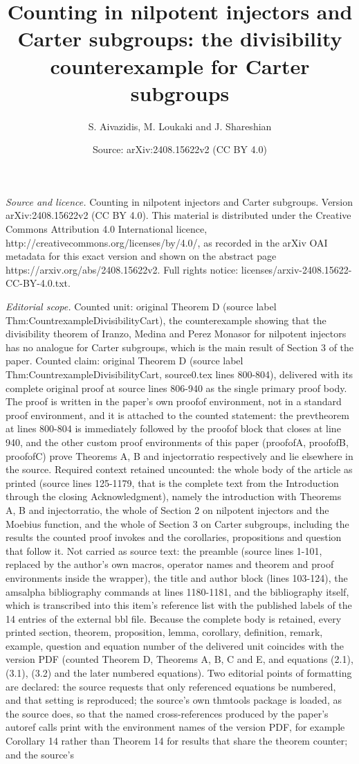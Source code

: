 \documentclass[10pt,a4paper]{amsart}
\title[Counting in nilpotent injectors and Carter subgroups: TheoremD]{Counting in nilpotent injectors and Carter subgroups: the divisibility counterexample for Carter subgroups}
\author{S. Aivazidis, M. Loukaki and J. Shareshian}
\date{Source: arXiv:2408.15622v2 (CC BY 4.0)}
\numberwithin{equation}{section}
\begin{document}
\maketitle
\noindent\emph{Source and licence.} Counting in nilpotent injectors and Carter subgroups. Version arXiv:2408.15622v2 (CC BY 4.0). This material is distributed under the Creative Commons Attribution 4.0 International licence, http://creativecommons.org/licenses/by/4.0/, as recorded in the arXiv OAI metadata for this exact version and shown on the abstract page https://arxiv.org/abs/2408.15622v2. Full rights notice: licenses/arxiv-2408.15622-CC-BY-4.0.txt.\par\smallskip
\noindent\textit{Editorial scope.} Counted unit: original Theorem D (source label Thm:CountrexampleDivisibilityCart), the counterexample showing that the divisibility theorem of Iranzo, Medina and Perez Monasor for nilpotent injectors has no analogue for Carter subgroups, which is the main result of Section 3 of the paper. Counted claim: original Theorem D (source label Thm:CountrexampleDivisibilityCart, source0.tex lines 800-804), delivered with its complete original proof at source lines 806-940 as the single primary proof body. The proof is written in the paper's own proofof environment, not in a standard proof environment, and it is attached to the counted statement: the prevtheorem at lines 800-804 is immediately followed by the proofof block that closes at line 940, and the other custom proof environments of this paper (proofofA, proofofB, proofofC) prove Theorems A, B and injectorratio respectively and lie elsewhere in the source. Required context retained uncounted: the whole body of the article as printed (source lines 125-1179, that is the complete text from the Introduction through the closing Acknowledgment), namely the introduction with Theorems A, B and injectorratio, the whole of Section 2 on nilpotent injectors and the Moebius function, and the whole of Section 3 on Carter subgroups, including the results the counted proof invokes and the corollaries, propositions and question that follow it. Not carried as source text: the preamble (source lines 1-101, replaced by the author's own macros, operator names and theorem and proof environments inside the wrapper), the title and author block (lines 103-124), the amsalpha bibliography commands at lines 1180-1181, and the bibliography itself, which is transcribed into this item's reference list with the published labels of the 14 entries of the external bbl file. Because the complete body is retained, every printed section, theorem, proposition, lemma, corollary, definition, remark, example, question and equation number of the delivered unit coincides with the version PDF (counted Theorem D, Theorems A, B, C and E, and equations (2.1), (3.1), (3.2) and the later numbered equations). Two editorial points of formatting are declared: the source requests that only referenced equations be numbered, and that setting is reproduced; the source's own thmtools package is loaded, as the source does, so that the named cross-references produced by the paper's autoref calls print with the environment names of the version PDF, for example Corollary 14 rather than Theorem 14 for results that share the theorem counter; and the source's 
\end{document}

